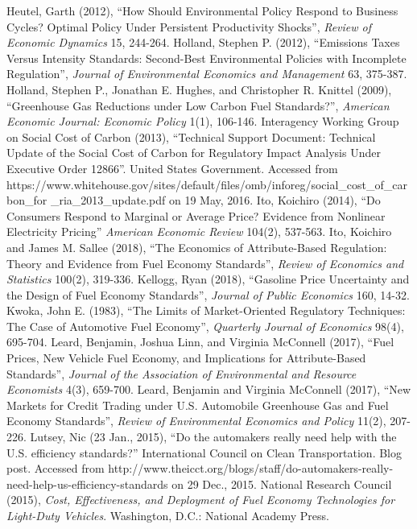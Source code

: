 \documentclass[12pt]{article}
\begin{document}
\begin{thebibliography}{99}
\bibitem{} Heutel, Garth (2012), ``How Should Environmental Policy Respond to Business Cycles? Optimal Policy Under Persistent Productivity Shocks'', {\it Review of Economic Dynamics} 15, 244-264.
\bibitem{} Holland, Stephen P. (2012), ``Emissions Taxes Versus Intensity Standards: Second-Best Environmental Policies with Incomplete Regulation'', {\it Journal of Environmental Economics and Management} 63, 375-387.
\bibitem{} Holland, Stephen P., Jonathan E. Hughes, and Christopher R. Knittel (2009), ``Greenhouse Gas Reductions under Low Carbon Fuel Standards?'', {\it American Economic Journal: Economic Policy} 1(1), 106-146.
\bibitem{} Interagency Working Group on Social Cost of Carbon (2013), ``Technical Support Document: Technical Update of the Social Cost of Carbon for Regulatory Impact Analysis Under Executive Order 12866''. United States Government. Accessed from https://www.whitehouse.gov/sites/default/files/omb/inforeg/social\_cost\_of\_carbon\_for \_ria\_2013\_update.pdf on 19 May, 2016.
\bibitem{} Ito, Koichiro (2014), ``Do Consumers Respond to Marginal or Average Price? Evidence from Nonlinear Electricity Pricing'' {\it American Economic Review} 104(2), 537-563.
\bibitem{} Ito, Koichiro and James M. Sallee (2018), ``The Economics of Attribute-Based Regulation: Theory and Evidence from Fuel Economy Standards'', {\it Review of Economics and Statistics} 100(2), 319-336.
\bibitem{} Kellogg, Ryan (2018), ``Gasoline Price Uncertainty and the Design of Fuel Economy Standards'', {\it Journal of Public Economics} 160, 14-32.
\bibitem{} Kwoka, John E. (1983), ``The Limits of Market-Oriented Regulatory Techniques: The Case of Automotive Fuel Economy'', {\it Quarterly Journal of Economics} 98(4), 695-704.
\bibitem{} Leard, Benjamin, Joshua Linn, and Virginia McConnell (2017), ``Fuel Prices, New Vehicle Fuel Economy, and Implications for Attribute-Based Standards'', {\it Journal of the Association of Environmental and Resource Economists} 4(3), 659-700.
\bibitem{} Leard, Benjamin and Virginia McConnell (2017), ``New Markets for Credit Trading under U.S. Automobile Greenhouse Gas and Fuel Economy Standards'', {\it Review of Environmental Economics and Policy} 11(2), 207-226.
\bibitem{} Lutsey, Nic (23 Jan., 2015), ``Do the automakers really need help with the U.S. efficiency standards?'' International Council on Clean Transportation. Blog post. Accessed from http://www.theicct.org/blogs/staff/do-automakers-really-need-help-us-efficiency-standards on 29 Dec., 2015.
\bibitem{} National Research Council (2015), {\it Cost, Effectiveness, and Deployment of Fuel Economy Technologies for Light-Duty Vehicles}. Washington, D.C.: National Academy Press.

\end{thebibliography}
\end{document}
